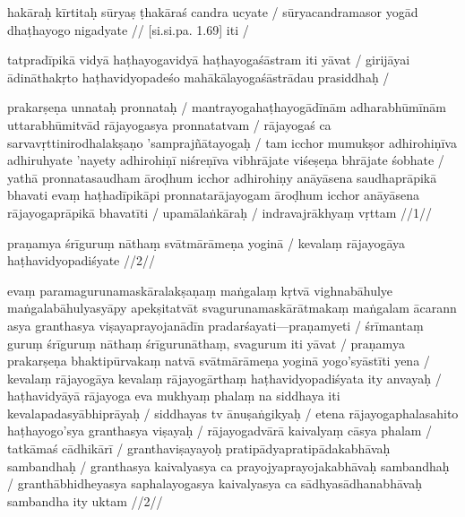 \begin{ekdosis}
\begin{jyotsna}[hp01_001]
    hakāraḥ kīrtitaḥ sūryaṣ ṭhakāraś candra ucyate /
    sūryacandramasor yogād dhaṭhayogo nigadyate // [si.si.pa. 1.69] iti /

    tatpradīpikā vidyā haṭhayogavidyā haṭhayogaśāstram iti yāvat / girijāyai ādināthakṛto
    haṭhavidyopadeśo mahākālayogaśāstrādau prasiddhaḥ /

    prakarṣeṇa unnataḥ pronnataḥ / mantrayogahaṭhayogādīnām adharabhūmīnām uttarabhūmitvād rājayogasya
    pronnatatvam / rājayogaś ca sarvavṛttinirodhalakṣaṇo 'samprajñātayogaḥ / tam icchor mumukṣor
    adhirohiṇīva adhiruhyate 'nayety adhirohiṇī niśreṇīva vibhrājate viśeṣeṇa bhrājate śobhate / yathā
    pronnatasaudham āroḍhum icchor adhirohiṇy anāyāsena saudhaprāpikā bhavati evaṃ haṭhadīpikāpi
    pronnatarājayogam āroḍhum icchor anāyāsena rājayogaprāpikā bhavatīti / upamālaṅkāraḥ /
    indravajrākhyaṃ vṛttam //1// 
  \end{jyotsna}

  \begin{jyotsna}[hp01_002]
    praṇamya śrīguruṃ nāthaṃ svātmārāmeṇa yoginā /
    kevalaṃ rājayogāya haṭhavidyopadiśyate //2//

    evaṃ paramagurunamaskāralakṣaṇaṃ maṅgalaṃ kṛtvā vighnabāhulye maṅgalabāhulyasyāpy apekṣitatvāt
    svagurunamaskārātmakaṃ maṅgalam ācarann asya granthasya viṣayaprayojanādīn
    pradarśayati—praṇamyeti / śrīmantaṃ guruṃ śrīguruṃ nāthaṃ śrīgurunāthaṃ, svagurum iti yāvat /
    praṇamya prakarṣeṇa bhaktipūrvakaṃ natvā svātmārāmeṇa yoginā yogo'syāstīti yena / kevalaṃ
    rājayogāya kevalaṃ rājayogārthaṃ haṭhavidyopadiśyata ity anvayaḥ / haṭhavidyāyā rājayoga eva
    mukhyaṃ phalaṃ na siddhaya iti kevalapadasyābhiprāyaḥ / siddhayas tv ānuṣaṅgikyaḥ / etena
    rājayogaphalasahito haṭhayogo'sya granthasya viṣayaḥ / rājayogadvārā kaivalyaṃ cāsya phalam /
    tatkāmaś cādhikārī / granthaviṣayayoḥ pratipādyapratipādakabhāvaḥ sambandhaḥ / granthasya
    kaivalyasya ca prayojyaprayojakabhāvaḥ sambandhaḥ / granthābhidheyasya saphalayogasya
    kaivalyasya ca sādhyasādhanabhāvaḥ sambandha ity uktam //2//
  \end{jyotsna}

\end{ekdosis}

